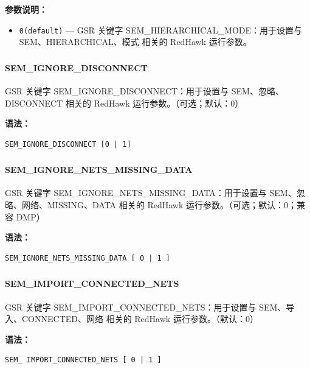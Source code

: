 \textbf{参数说明：}
\begin{itemize}
\item \texttt{0(default)} — GSR 关键字 SEM\_HIERARCHICAL\_MODE：用于设置与 SEM、HIERARCHICAL、模式 相关的 RedHawk 运行参数。
\end{itemize}

\subsubsection{}
\paragraph*{SEM_IGNORE_DISCONNECT}

GSR 关键字 SEM_IGNORE_DISCONNECT：用于设置与 SEM、忽略、DISCONNECT 相关的 RedHawk 运行参数。（可选；默认：0）

\textbf{语法：}
\begin{lstlisting}
SEM_IGNORE_DISCONNECT [0 | 1]
\end{lstlisting}

\subsubsection{}
\paragraph*{SEM_IGNORE_NETS_MISSING_DATA}

GSR 关键字 SEM_IGNORE_NETS_MISSING_DATA：用于设置与 SEM、忽略、网络、MISSING、DATA 相关的 RedHawk 运行参数。（可选；默认：0；兼容 DMP）

\textbf{语法：}
\begin{lstlisting}
SEM_IGNORE_NETS_MISSING_DATA [ 0 | 1 ]
\end{lstlisting}

\subsubsection{}
\paragraph*{SEM_IMPORT_CONNECTED_NETS}

GSR 关键字 SEM_IMPORT_CONNECTED_NETS：用于设置与 SEM、导入、CONNECTED、网络 相关的 RedHawk 运行参数。（默认：0）

\textbf{语法：}
\begin{lstlisting}
SEM_ IMPORT_CONNECTED_NETS [ 0 | 1 ]
\end{lstlisting}

